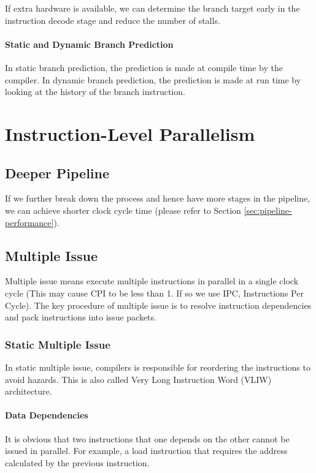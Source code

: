 \documentclass[a4paper,12pt]{article}
\begin{document}
If extra hardware is available, we can determine the branch target early in the instruction decode stage and reduce the number of stalls.

\paragraph{Static and Dynamic Branch Prediction} In static branch prediction, the prediction is made at compile time by the compiler. In dynamic branch prediction, the prediction is made at run time by looking at the history of the branch instruction.

\section{Instruction-Level Parallelism}

\subsection{Deeper Pipeline}

If we further break down the process and hence have more stages in the pipeline, we can achieve shorter clock cycle time (please refer to Section \ref{sec:pipeline-performance}). 

\subsection{Multiple Issue}

Multiple issue means execute multiple instructions in parallel in a single clock cycle (This may cause CPI to be less than 1. If so we use IPC, Instructions Per Cycle). The key procedure of multiple issue is to resolve instruction dependencies and pack instructions into issue packets.

\subsubsection{Static Multiple Issue}

In static multiple issue, compilers is responsible for reordering the instructions to avoid hazards. This is also called Very Long Instruction Word (VLIW) architecture. 

\paragraph{Data Dependencies} It is obvious that two instructions that one depends on the other cannot be issued in parallel. For example, a load instruction that requires the address calculated by the previous instruction.
\end{document}

